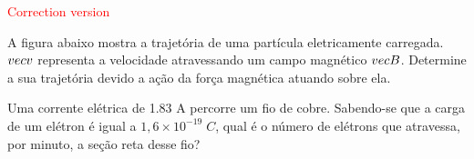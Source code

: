 \documentclass[12pt, addpoints]{exam}
\begin{document}
        \begin{center}
\textcolor{red}{\emph\Large Correction version}\end{center}
\begin{questions}
\begin{multicols*}{2}
\question[20] A ﬁgura abaixo mostra a trajetória de uma partícula eletricamente carregada. $\\vec{{v}}$ representa a velocidade atravessando um campo magnético $\\vec{{B}}$. Determine a sua trajetória devido a ação da força magnética atuando sobre ela.
        
        \begin{center}
            \begin{minipage}[c]{0.5\linewidth}
            \end{minipage}
        \end{center}

        

\begin{oneparchoices}
\end{oneparchoices}
\question[20] Uma corrente elétrica de    1.83 A percorre um ﬁo de cobre. Sabendo-se que a carga de um elétron é igual a $1,6\times 10^{-19}\;C$, qual é o número de elétrons que atravessa, por minuto, a seção reta desse ﬁo?


\end{multicols*}
\end{questions}
\end{document}
